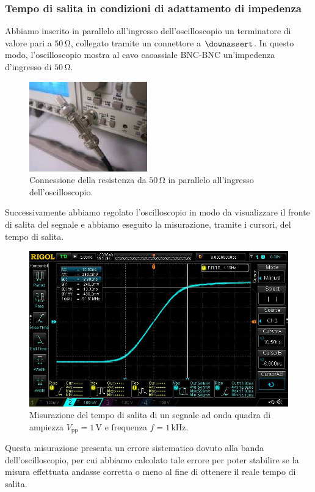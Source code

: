 \documentclass[a4paper]{article}
\begin{document}
			\subsubsection{Tempo di salita in condizioni di adattamento di impedenza}
				Abbiamo inserito in parallelo all'ingresso dell'oscilloscopio un terminatore di valore pari a $ 50 \, \mathrm{\Omega} $, collegato tramite un connettore a $ \mathrm{\downassert} $. In questo modo, l'oscilloscopio mostra al cavo caoassiale BNC-BNC un'impedenza d'ingresso di $ 50 \, \mathrm{\Omega} $.
				\begin{figure}[h!]
					\centering
					\includegraphics[scale=0.7]{connettoreAT}
					\caption{Connessione della resistenza da $ 50 \, \mathrm{\Omega} $ in parallelo all'ingresso dell'oscilloscopio.}
					\label{fig:connettoreAT}
				\end{figure}
				\newpage
				Successivamente abbiamo regolato l'oscilloscopio in modo da visualizzare il fronte di salita del segnale e abbiamo eseguito la misurazione, tramite i cursori, del tempo di salita.
				\begin{figure}[h!]
					\centering
					\includegraphics[scale=0.3]{tempoSalitaAdattamentoImpedenza}
					\caption{Misurazione del tempo di salita di un segnale ad onda quadra di ampiezza $ V_{\mathrm{pp}} = 1 \, \mathrm{V} $ e frequenza $ f = 1 \, \mathrm{kHz} $.}
					\label{fig:tempoSalitaAdattamentoImpedenza}
				\end{figure}
				\newline
				Questa misurazione presenta un errore sistematico dovuto alla banda dell'oscilloscopio, per cui abbiamo calcolato tale errore per poter stabilire se la misura effettuata andasse corretta o meno al fine di ottenere il reale tempo di salita.
\end{document}
